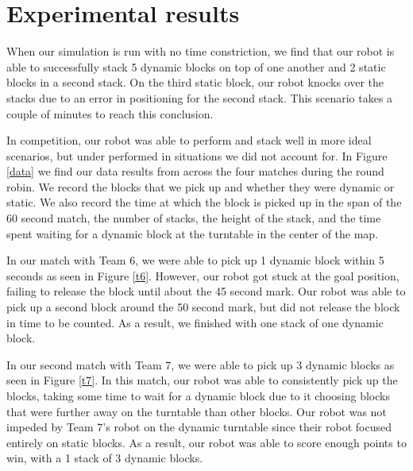 \documentclass{article}
\begin{document}
    
    
    




\section{Experimental results}
When our simulation is run with no time constriction, we find that our robot is able to successfully stack 5 dynamic blocks on top of one another and 2 static blocks in a second stack.  On the third static block, our robot knocks over the stacks due to an error in positioning for the second stack.  This scenario takes a couple of minutes to reach this conclusion.

In competition, our robot was able to perform and stack well in more ideal scenarios, but under performed in situations we did not account for.  In Figure \ref{data} we find our data results from across the four matches during the round robin.  We record the blocks that we pick up and whether they were dynamic or static.  We also record the time at which the block is picked up in the span of the 60 second match, the number of stacks, the height of the stack, and the time spent waiting for a dynamic block at the turntable in the center of the map.  

In our match with Team 6, we were able to pick up 1 dynamic block within 5 seconds as seen in Figure \ref{t6}.  However, our robot got stuck at the goal position, failing to release the block until about the 45 second mark.  Our robot was able to pick up a second block around the 50 second mark, but did not release the block in time to be counted.  As a result, we finished with one stack of one dynamic block.  

In our second match with Team 7, we were able to pick up 3 dynamic blocks as seen in Figure \ref{t7}.  In this match, our robot was able to consistently pick up the blocks, taking some time to wait for a dynamic block due to it choosing blocks that were further away on the turntable than other blocks.  Our robot was not impeded by Team 7's robot on the dynamic turntable since their robot focused entirely on static blocks.  As a result, our robot was able to score enough points to win, with a 1 stack of 3 dynamic blocks.
\end{document}
